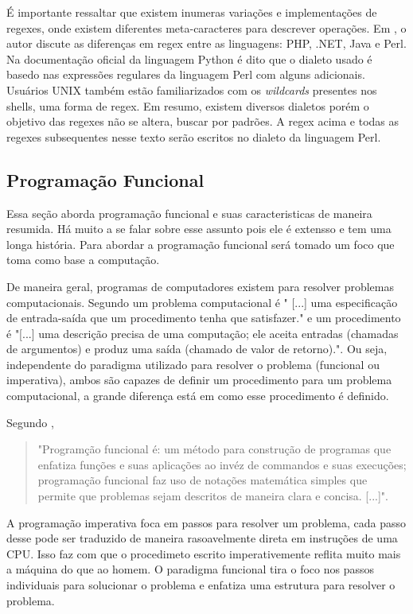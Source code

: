 É importante ressaltar que existem inumeras variações e implementações de regexes, onde existem diferentes meta-caracteres para descrever operações.
Em \cite{mastering}, o autor discute as diferenças em regex entre as linguagens: PHP, .NET, Java e Perl.
Na documentação oficial da linguagem Python \cite{python-re} é dito que o dialeto usado é basedo nas expressões regulares da linguagem Perl com alguns adicionais.
Usuários UNIX também estão familiarizados com os \emph{wildcards} presentes nos shells, uma forma de regex.
Em resumo, existem diversos dialetos porém o objetivo das regexes não se altera, buscar por padrões.
A regex acima e todas as regexes subsequentes nesse texto serão escritos no dialeto da linguagem Perl. 

\subsection{Programação Funcional}

Essa seção aborda programação funcional e suas caracteristicas de maneira resumida.
Há muito a se falar sobre esse assunto pois ele é extensso e tem uma longa história.
Para abordar a programação funcional será tomado um foco que toma como base a computação.

De maneira geral, programas de computadores existem para resolver problemas computacionais.
Segundo \cite{matrix} um problema computacional é
" [...] uma especificação de entrada-saída que um procedimento tenha que satisfazer."
e um procedimento é
"[...] uma descrição precisa de uma computação; ele aceita entradas (chamadas de argumentos) e produz uma saída (chamado de valor de retorno).".
Ou seja, independente do paradigma utilizado para resolver o problema (funcional ou imperativa), ambos são capazes de definir um procedimento para um problema computacional, a grande diferença está em como esse procedimento é definido.

Segundo \cite{Bird},
\begin{quotation}
"Programção funcional é: um método para construção de programas que enfatiza funções e suas aplicações ao invéz de commandos e suas execuções; programação funcional faz uso de notações matemática simples que permite que problemas sejam descritos de maneira clara e concisa. [...]".
\end{quotation}
A programação imperativa foca em passos para resolver um problema, cada passo desse pode ser traduzido de maneira rasoavelmente direta em instruções de uma CPU.
Isso faz com que o procedimeto escrito imperativemente reflita muito mais a máquina do que ao homem.
O paradigma funcional tira o foco nos passos individuais para solucionar o problema e enfatiza uma estrutura para resolver o problema.

